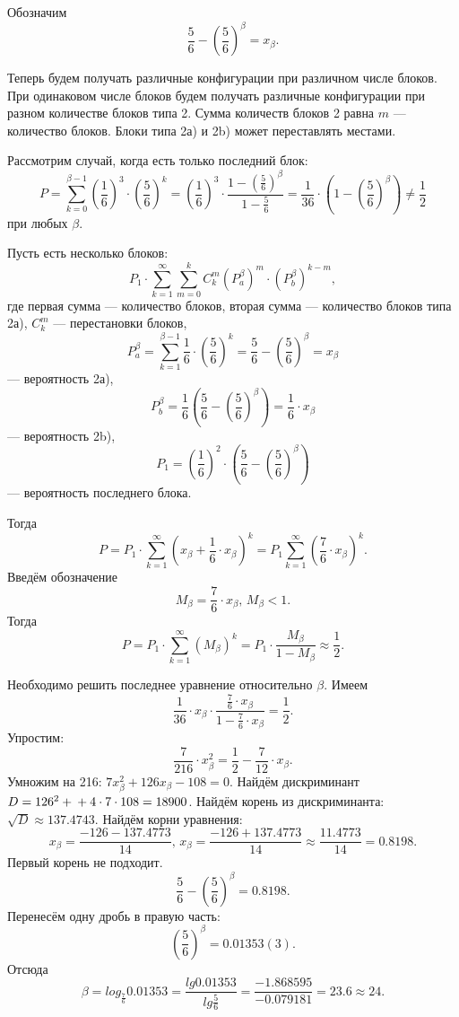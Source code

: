 Обозначим
$$ \frac{5}{6} - \left( \frac{5}{6} \right)^{ \beta } =
x_{ \beta }.$$

Теперь будем получать различные конфигурации при различном числе блоков.
При одинаковом числе блоков будем получать различные конфигурации при разном количестве блоков типа 2.
Сумма количеств блоков 2 равна $m$ --- количество блоков.
Блоки типа 2а) и 2b) может переставлять местами.

Рассмотрим случай, когда есть только последний блок:
$$P =
\sum \limits_{k=0}^{ \beta -1} \left( \frac{1}{6} \right)^3 \cdot \left( \frac{5}{6} \right)^k =
\left( \frac{1}{6} \right)^3 \cdot \frac{1 - \left( \frac{5}{6} \right)^{ \beta }}{1 - \frac{5}{6}} =
\frac{1}{36} \cdot \left( 1 - \left( \frac{5}{6} \right)^{ \beta } \right) \neq
\frac{1}{2}$$
при любых $ \beta $.

Пусть есть несколько блоков:
$$P_1 \cdot \sum \limits_{k=1}^{ \infty } \sum \limits_{m=0}^k C_k^m \left( P_a^{ \beta } \right)^m \cdot \left( P_b^{ \beta } \right)^{k-m},$$
где первая сумма --- количество блоков, вторая сумма --- количество блоков типа 2а), $C_k^m$ --- перестановки блоков,
$$P_a^{ \beta } =
\sum \limits_{k=1}^{ \beta -1} \frac{1}{6} \cdot \left( \frac{5}{6} \right)^k =
\frac{5}{6} - \left( \frac{5}{6} \right)^{ \beta } =
x_{ \beta }$$
--- вероятность 2а),
$$P_b^{ \beta } =
\frac{1}{6} \left( \frac{5}{6} - \left( \frac{5}{6} \right)^{ \beta } \right) =
\frac{1}{6} \cdot x_{ \beta }$$
--- вероятность 2b),
$$P_1 =
\left( \frac{1}{6} \right)^2 \cdot \left( \frac{5}{6} - \left( \frac{5}{6} \right)^{ \beta } \right) $$
--- вероятность последнего блока.

Тогда
$$P =
P_1 \cdot \sum \limits_{k=1}^{ \infty } \left( x_{ \beta } + \frac{1}{6} \cdot x_{ \beta } \right)^k =
P_1 \sum \limits_{k=1}^{ \infty } \left( \frac{7}{6} \cdot x_{ \beta } \right)^k.$$
Введём обозначение
$$M_{ \beta } =
\frac{7}{6} \cdot x_{ \beta }, \,
M_{ \beta} <  1.$$
Тогда
$$P =
P_1 \cdot \sum \limits_{k=1}^{ \infty } \left( M_{ \beta } \right)^k =
P_1 \cdot \frac{M_{ \beta }}{1 - M_{ \beta }} \approx \frac{1}{2}.$$

Необходимо решить последнее уравнение относительно $ \beta $.
Имеем
$$ \frac{1}{36} \cdot x_{ \beta } \cdot \frac{ \frac{7}{6} \cdot x_{ \beta }}{1 - \frac{7}{6} \cdot x_{ \beta }} =
\frac{1}{2}.$$
Упростим:
$$ \frac{7}{216} \cdot x_{ \beta }^2 =
\frac{1}{2} - \frac{7}{12} \cdot x_{ \beta }.$$
Умножим на 216: $7x_{ \beta }^2 + 126x_{ \beta } - 108 = 0$.
Найдём дискриминант $D = 126^2 + \\ + 4 \cdot 7 \cdot 108 = 18900$.
Найдём корень из дискриминанта: $ \sqrt{D} \approx 137.4743$.
Найдём корни уравнения:
$$x_{ \beta } =
\frac{-126-137.4773}{14}, \,
x_{ \beta } =
\frac{-126+137.4773}{14} \approx
\frac{11.4773}{14} =
0.8198.$$
Первый корень не подходит.
$$ \frac{5}{6} - \left( \frac{5}{6} \right)^{ \beta } =
0.8198.$$
Перенесём одну дробь в правую часть:
$$ \left( \frac{5}{6} \right)^{ \beta } =
0.01353 \left( 3 \right).$$
Отсюда
$$ \beta =
log_{ \frac{7}{6}} 0.01353 =
\frac{lg 0.01353}{lg \frac{5}{6}} =
\frac{-1.868595}{-0.079181} =
23.6 \approx
24.$$
